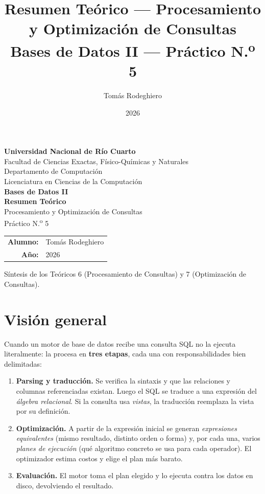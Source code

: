 \documentclass[11pt,a4paper]{article}
\title{Resumen Teórico --- Procesamiento y Optimización de Consultas\\[4pt]
       \large Bases de Datos II --- Práctico N.\textsuperscript{o} 5}
\author{Tomás Rodeghiero}
\date{2026}
\begin{document}
\begin{titlepage}
    \centering
    \vspace*{1.5cm}

    {\large \textbf{Universidad Nacional de Río Cuarto}}\\[6pt]
    {\normalsize Facultad de Ciencias Exactas, Físico-Químicas y Naturales}\\[4pt]
    {\normalsize Departamento de Computación}\\[4pt]
    {\normalsize Licenciatura en Ciencias de la Computación}\\[3cm]

    {\Large \textbf{Bases de Datos II}}\\[1.2cm]

    {\Large \textbf{Resumen Teórico}}\\[6pt]
    {\large Procesamiento y Optimización de Consultas\\[2pt]
    Práctico N.\textsuperscript{o} 5}\\[3cm]

    \begin{tabular}{rl}
        \textbf{Alumno:} & Tomás Rodeghiero \\[4pt]
        \textbf{Año:}    & 2026 \\
    \end{tabular}

    \vfill
    {\small Síntesis de los Teóricos 6 (Procesamiento de Consultas) y 7
    (Optimización de Consultas).}
\end{titlepage}

\tableofcontents
\newpage

\section{Visión general}

Cuando un motor de base de datos recibe una consulta SQL no la ejecuta
literalmente: la procesa en \textbf{tres etapas}, cada una con responsabilidades
bien delimitadas:

\begin{enumerate}
    \item \textbf{Parsing y traducción.} Se verifica la sintaxis y que las
    relaciones y columnas referenciadas existan. Luego el SQL se traduce a
    una expresión del \emph{álgebra relacional}. Si la consulta usa
    \emph{vistas}, la traducción reemplaza la vista por su definición.
    \item \textbf{Optimización.} A partir de la expresión inicial se generan
    \emph{expresiones equivalentes} (mismo resultado, distinto orden o forma)
    y, por cada una, varios \emph{planes de ejecución} (qué algoritmo concreto
    se usa para cada operador). El optimizador estima costos y elige el plan
    más barato.
    \item \textbf{Evaluación.} El motor toma el plan elegido y lo ejecuta
    contra los datos en disco, devolviendo el resultado.
\end{enumerate}
\end{document}

